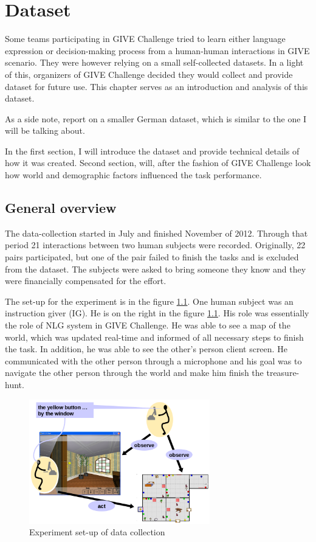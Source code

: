 \chapter{Dataset}
Some teams participating in GIVE Challenge tried to learn either language expression or decision-making process from a human-human interactions in GIVE scenario. They were however relying on a small self-collected datasets. In a light of this, organizers of GIVE Challenge decided they would collect and provide dataset for future use. This chapter serves as an introduction and analysis of this dataset.

As a side note, \citet{striegnitz2012referring} report on a smaller German dataset, which is similar to the one I will be talking about. 

In the first section, I will introduce the dataset and provide technical details of how it was created. Second section, will, after the fashion of GIVE Challenge look how world and demographic factors influenced the task performance.

\section{General overview}
The data-collection started in July and finished November of 2012. Through that period 21 interactions between two human subjects were recorded. Originally, 22 pairs participated, but one of the pair failed to finish the tasks and is excluded from the dataset. The subjects were asked to bring someone they know and they were financially compensated for the effort. 

The set-up for the experiment is in the figure \ref{fig:give-experiment-setup}. One human subject was an instruction giver (IG). He is on the right in the figure \ref{fig:give-experiment-setup}. His role was essentially the role of NLG system in GIVE Challenge. He was able to see a map of the world, which was updated real-time and informed of all necessary steps to finish the task. In addition, he was able to see the other's person client screen. He communicated with the other person through a microphone and his goal
was to navigate the other person through the world and make him finish the treasure-hunt.

\begin{figure}[h]
  \centering
	\includegraphics[width=0.7\textwidth]{Images/experiment-set-up}
	\caption{Experiment set-up of data collection}
	\label{fig:give-experiment-setup}
\end{figure}

